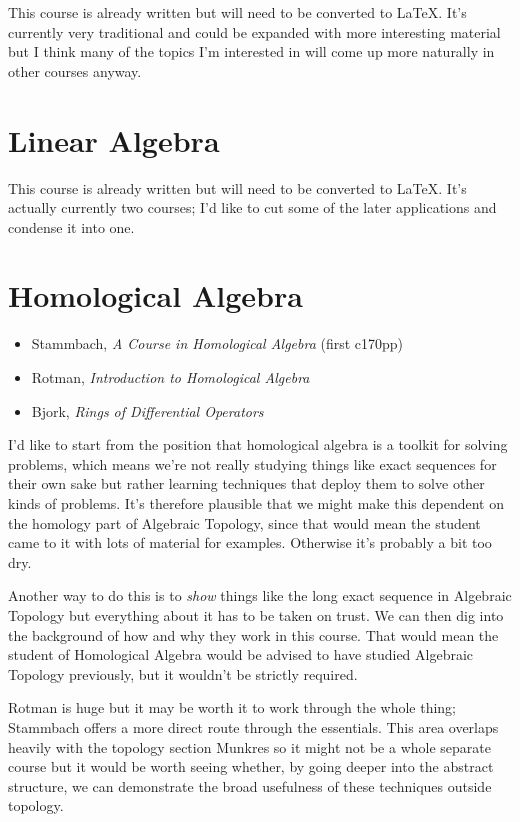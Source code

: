\documentclass[article]{article}
\begin{document}
This course is already written but will need to be converted to \LaTeX. It's currently very traditional and could be expanded with more interesting material but I think many of the topics I'm interested in will come up more naturally in other courses anyway.


\section{Linear Algebra}

This course is already written but will need to be converted to \LaTeX. It's actually currently two courses; I'd like to cut some of the later applications and condense it into one.

\section{Homological Algebra}

\begin{itemize}
	\item{Stammbach, \textit{A Course in Homological Algebra} (first c170pp)}
	\item{Rotman, \textit{Introduction to Homological Algebra}}
	\item{Bjork, \textit{Rings of Differential Operators}}
\end{itemize}

I'd like to start from the position that homological algebra is a toolkit for solving problems, which means we're not really studying things like exact sequences for their own sake but rather learning techniques that deploy them to solve other kinds of problems. It's therefore plausible that we might make this dependent on the homology part of Algebraic Topology, since that would mean the student came to it with lots of material for examples. Otherwise it's probably a bit too dry.

Another way to do this is to \emph{show} things like the long exact sequence in Algebraic Topology but everything about it has to be taken on trust. We can then dig into the background of how and why they work in this course. That would mean the student of Homological Algebra would be advised to have studied Algebraic Topology previously, but it wouldn't be strictly required.

Rotman is huge but it may be worth it to work through the whole thing; Stammbach offers a more direct route through the essentials. This area overlaps heavily with the topology section Munkres so it might not be a whole separate course but it would be worth seeing whether, by going deeper into the abstract structure, we can demonstrate the broad usefulness of these techniques outside topology.
\end{document}
